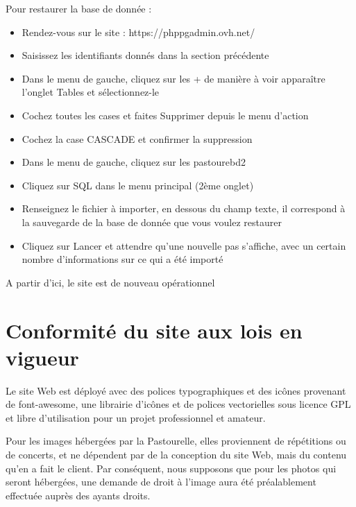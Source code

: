\documentclass[11pt]{report}
\begin{document}
\par Pour restaurer la base de donnée : 
\begin{itemize}
  \item Rendez-vous sur le site : https://phppgadmin.ovh.net/
  \item Saisissez les identifiants donnés dans la section précédente
  \item Dans le menu de gauche, cliquez sur les \og + \fg{} de manière à voir
  apparaître l'onglet \og Tables \fg{} et sélectionnez-le
  \item Cochez toutes les cases et faites \og Supprimer \fg{} depuis le menu
  d'action
  \item Cochez la case \og CASCADE \fg{} et confirmer la suppression
  \item  Dans le menu de gauche, cliquez sur les \og pastourebd2 \fg{}
  \item Cliquez sur \og SQL \fg{} dans le menu principal (2ème onglet)
  \item Renseignez le fichier à importer, en dessous du champ texte, il
  correspond à la sauvegarde de la base de donnée que vous voulez restaurer
  \item Cliquez sur \og Lancer \fg{} et attendre qu'une nouvelle pas s'affiche,
  avec un certain nombre d'informations sur ce qui a été importé \\
\end{itemize}

\par A partir d'ici, le site est de nouveau opérationnel

\section{Conformité du site aux lois en vigueur}
Le site Web est déployé avec des polices typographiques et des icônes provenant
de font-awesome, une librairie d’icônes et de polices vectorielles sous licence
GPL et libre d'utilisation pour un projet professionnel et amateur. \\

\par Pour les images hébergées par la Pastourelle, elles proviennent de 
répétitions ou de concerts, et ne dépendent par de la conception du site Web, 
mais du contenu qu'en a fait le client. Par conséquent, nous supposons que pour 
les photos qui seront hébergées, une demande de droit à l'image aura été 
préalablement effectuée auprès des ayants droits. \\
\end{document}

